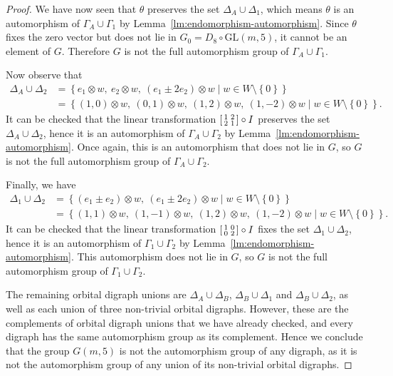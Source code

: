 \documentclass[10pt]{amsart}
\theoremstyle{definition}
\theoremstyle{plain}
\theoremstyle{plain}
\theoremstyle{plain}
\theoremstyle{plain}
\newcommand{\GL}{\mathrm{GL}}
\begin{document}
\begin{proof}
We have now seen that $\theta$ preserves the set $\Delta_A \cup \Delta_1$, which means $\theta$ is an automorphism of $\Gamma_A \cup \Gamma_1$ by Lemma~\ref{lm:endomorphism-automorphism}. Since $\theta$ fixes the zero vector but does not lie in $G_0 = D_8 \circ \GL{\left(m, 5 \right)}$, it cannot be an element of $G$. Therefore $G$ is not the full automorphism group of $\Gamma_A \cup \Gamma_1$.

Now observe that
\begin{align*}
\Delta_A \cup \Delta_2 &= \left\{e_1 \otimes w,\ e_2 \otimes w,\ \left(e_1 \pm 2 e_2 \right) \otimes w \mid w \in W \setminus \left\{0 \right\}\right\} \\
&= {\left\{\left(1, 0 \right) \otimes w,\ \left(0, 1 \right) \otimes w,\ \left(1, 2 \right) \otimes w,\ \left(1, -2 \right) \otimes w \mid w \in W \setminus \left\{0 \right\}\right\}}.
\end{align*}
It can be checked that the linear transformation $\begin{bsmallmatrix} 1 & 2 \\ 2 & 1 \end{bsmallmatrix} \circ I$ preserves the set $\Delta_A \cup \Delta_2$, hence it is an automorphism of $\Gamma_A \cup \Gamma_2$ by Lemma~\ref{lm:endomorphism-automorphism}. Once again, this is an automorphism that does not lie in $G$, so $G$ is not the full automorphism group of $\Gamma_A \cup \Gamma_2$.

Finally, we have
\begin{align*}
\Delta_1 \cup \Delta_2 &= \left\{\left(e_1 \pm e_2 \right) \otimes w,\ \left(e_1 \pm 2 e_2 \right) \otimes w \mid w \in W \setminus \left\{0 \right\}\right\} \\
&= {\left\{\left(1, 1 \right) \otimes w,\ \left(1, -1 \right) \otimes w,\ \left(1, 2 \right) \otimes w,\ \left(1, -2 \right) \otimes w \mid w \in W \setminus \left\{0 \right\}\right\}}.
\end{align*}
It can be checked that the linear transformation $\begin{bsmallmatrix} 1 & 0 \\ 0 & 2 \end{bsmallmatrix} \circ I$ fixes the set $\Delta_1 \cup \Delta_2$, hence it is an automorphism of $\Gamma_1 \cup \Gamma_2$ by Lemma~\ref{lm:endomorphism-automorphism}. This automorphism does not lie in $G$, so $G$ is not the full automorphism group of $\Gamma_1 \cup \Gamma_2$.

The remaining orbital digraph unions are $\Delta_A \cup \Delta_B$, $\Delta_B \cup \Delta_1$ and $\Delta_B \cup \Delta_2$, as well as each union of three non-trivial orbital digraphs. However, these are the complements of orbital digraph unions that we have already checked, and every digraph has the same automorphism group as its complement. Hence we conclude that the group $G{\left(m, 5 \right)}$ is not the automorphism group of any digraph, as it is not the automorphism group of any union of its non-trivial orbital digraphs.
\end{proof}
\end{document}

